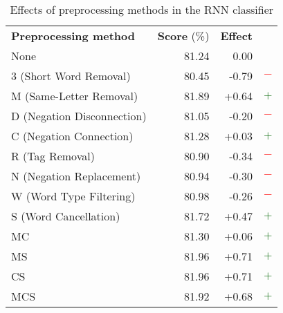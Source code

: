\begin{table}
	\centering
	\begin{tabular}{| l | r | r | c}
		\cline{1-3}
		\textbf{Preprocessing method} & \textbf{Score} (\%) & \textbf{Effect} & \\ \cline{1-3}
		None & 81.24 & 0.00  & \\ \cline{1-3}
		3 (Short Word Removal) & 80.45 & -0.79 & \textcolor{red}{$\bm{-}$}\\ \cline{1-3}
		M (Same-Letter Removal) & 81.89 & +0.64 & \textcolor{darkgreen}{$\bm{+}$}\\ \cline{1-3}
		D (Negation Disconnection) & 81.05 & -0.20 & \textcolor{red}{$\bm{-}$} \\ \cline{1-3}
		C (Negation Connection)	& 81.28 & +0.03  & \textcolor{darkgreen}{$\bm{+}$}\\ \cline{1-3}
		R (Tag Removal)	& 80.90 & -0.34 &  \textcolor{red}{$\bm{-}$} \\ \cline{1-3}
		N (Negation Replacement) & 80.94 & -0.30 & \textcolor{red}{$\bm{-}$} \\ \cline{1-3}
		W (Word Type Filtering) & 80.98 & -0.26 & \textcolor{red}{$\bm{-}$} \\ \cline{1-3}
		S (Word Cancellation)	& 81.72 & +0.47  & \textcolor{darkgreen}{$\bm{+}$}\\ \cline{1-3}
		MC & 81.30 & +0.06  & \textcolor{darkgreen}{$\bm{+}$}\\ \cline{1-3}
		MS & 81.96 & +0.71  & \textcolor{darkgreen}{$\bm{+}$}\\ \cline{1-3}
		CS & 81.96 & +0.71  & \textcolor{darkgreen}{$\bm{+}$}\\ \cline{1-3}
		MCS & 81.92 & +0.68  & \textcolor{darkgreen}{$\bm{+}$}\\ \cline{1-3}
	\end{tabular}
	\caption{Effects of preprocessing methods in the RNN classifier}
	\label{tab:rnn-prep-results-single}
\end{table}